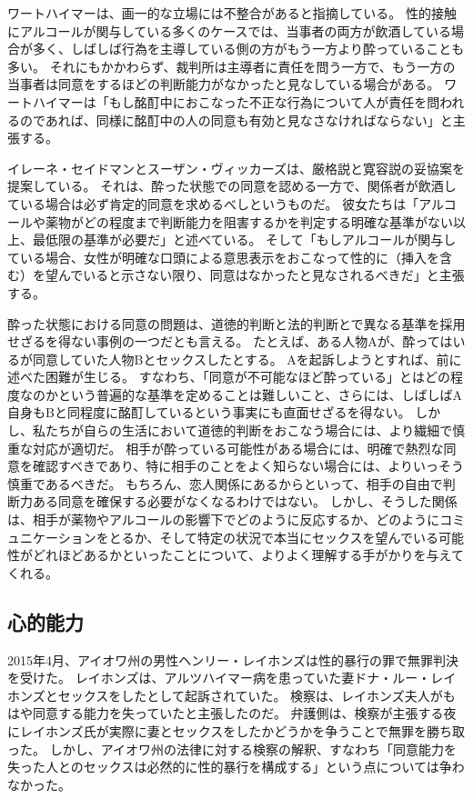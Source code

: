 \documentclass[paper=a4,book,openany]{jlreq} \usepackage{mystyle}
\begin{document}
ワートハイマーは、画一的な立場には不整合があると指摘している。
性的接触にアルコールが関与している多くのケースでは、当事者の両方が飲酒している場合が多く、しばしば行為を主導している側の方がもう一方より酔っていることも多い。
それにもかかわらず、裁判所は主導者に責任を問う一方で、もう一方の当事者は同意をするほどの判断能力がなかったと見なしている場合がある。
ワートハイマーは「もし酩酊中におこなった不正な行為について人が責任を問われるのであれば、同様に酩酊中の人の同意も有効と見なさなければならない」と主張する\citep[p.233]{wertheimer03:_consen_sexual_relat}。

イレーネ・セイドマンとスーザン・ヴィッカーズは、厳格説と寛容説の妥協案を提案している。
それは、酔った状態での同意を認める一方で、関係者が飲酒している場合は必ず肯定的同意を求めるべしというものだ。
彼女たちは「アルコールや薬物がどの程度まで判断能力を阻害するかを判定する明確な基準がない以上、最低限の基準が必要だ」と述べている。
そして「もしアルコールが関与している場合、女性が明確な口頭による意思表示をおこなって性的に（挿入を含む）を望んでいると示さない限り、同意はなかったと見なされるべきだ」と主張する\citep[p.486]{seidman05:_secon_wave}。

酔った状態における同意の問題は、道徳的判断と法的判断とで異なる基準を採用せざるを得ない事例の一つだとも言える。
たとえば、ある人物Aが、酔ってはいるが同意していた人物Bとセックスしたとする。
Aを起訴しようとすれば、前に述べた困難が生じる。
すなわち、「同意が不可能なほど酔っている」とはどの程度なのかという普遍的な基準を定めることは難しいこと、さらには、しばしばA自身もBと同程度に酩酊しているという事実にも直面せざるを得ない。
しかし、私たちが自らの生活において道徳的判断をおこなう場合には、より繊細で慎重な対応が適切だ。
相手が酔っている可能性がある場合には、明確で熱烈な同意を確認すべきであり、特に相手のことをよく知らない場合には、よりいっそう慎重であるべきだ。
もちろん、恋人関係にあるからといって、相手の自由で判断力ある同意を確保する必要がなくなるわけではない。
しかし、そうした関係は、相手が薬物やアルコールの影響下でどのように反応するか、どのようにコミュニケーションをとるか、そして特定の状況で本当にセックスを望んでいる可能性がどれほどあるかといったことについて、よりよく理解する手がかりを与えてくれる。

\subsection{心的能力}

2015年4月、アイオワ州の男性ヘンリー・レイホンズは性的暴行の罪で無罪判決を受けた。
レイホンズは、アルツハイマー病を患っていた妻ドナ・ルー・レイホンズとセックスをしたとして起訴されていた。
検察は、レイホンズ夫人がもはや同意する能力を失っていたと主張したのだ。
弁護側は、検察が主張する夜にレイホンズ氏が実際に妻とセックスをしたかどうかを争うことで無罪を勝ち取った。
しかし、アイオワ州の法律に対する検察の解釈、すなわち「同意能力を失った人とのセックスは必然的に性的暴行を構成する」という点については争わなかった\citep{belluck15:_sex_demen_husban_trial_age}。
\end{document}
